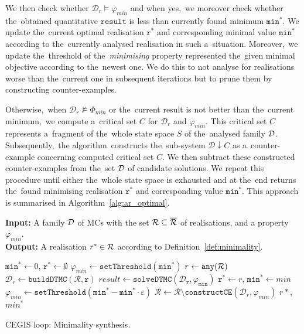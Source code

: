 We then check whether $\mathcal{D}_r \models \varphi_{min}$ and when yes,~we moreover check whether the~obtained quantitative $\mathtt{result}$ is less than currently found minimum $\mathtt{min^*}$.
We update the~current optimal realisation $\mathtt{r^*}$ and corresponding minimal value $\mathtt{min^*}$ according to the~currently analysed realisation in such a~situation.
Moreover,~we update the~threshold of the~\textit{minimising} property represented the~given minimal objective according to the~newest one.
We do this to not analyse for realisations worse than the~current one in subsequent iterations but to prune them by constructing counter-examples.

Otherwise,~when $\mathcal{D}_r \not\models \varPhi_{min}$ or the~current result is not better than the~current minimum,~we compute a~critical set $C$ for $\mathcal{D}_r$ and $\varphi_{min}$.
This critical set $C$ represents a~fragment of the~whole state space $S$ of the~analysed family $\mathcal{D}$.
Subsequently,~the algorithm~constructs the~sub-system $\mathcal{D}\!\downarrow\!C$ as a~counter-example concerning computed critical set $C$.
We then subtract these constructed counter-examples from the~set $\mathcal{D}$ of candidate solutions. 
We repeat this procedure until either the~whole state space is exhausted and at the~end returns the~found minimising realisation $\mathtt{r^*}$ and corresponding value $\mathtt{min^*}$.
This approach is summarised in Algorithm~\ref{alg:ar_optimal}.

\begin{algorithm}[h!]
\hspace*{\algorithmicindent} \textbf{Input:} A family $\mathcal{D}$ of MCs with the set $\mathcal{R} \subseteq \overline{\mathcal{R}}$ of realisations, and a property $\varphi_{min}$. \\
\hspace*{\algorithmicindent} \textbf{Output:}  A realisation $r^* \in \mathcal{R}$ according to Definition~\ref{def:minimality}. \\
\vspace*{-1.5em}
\begin{algorithmic}[1]
    \STATE $\mathtt{min^*} \leftarrow 0$, $\mathtt{r^*} \leftarrow \emptyset$
    \STATE $\varphi_{min} \leftarrow \mathtt{setThreshold(min^*)}$
    \WHILE{$\rlz \neq \emptyset$}
        \STATE $r \leftarrow \mathtt{any(\mathcal{R})}$
        \STATE $\mathcal{D}_r\leftarrow \mathtt{buildDTMC(\mathcal{R}, r)}$
        \STATE $result \leftarrow \mathtt{solveDTMC(\mathcal{D}_r, \varphi_{min})}$
            \STATE $\mathtt{r^*} \leftarrow r$, $\mathtt{min^*} \leftarrow min$
            \STATE $\varphi_{min} \leftarrow \mathtt{setThreshold(min^* - min^* \cdot \varepsilon)}$
        \ELSE
            \STATE $\mathcal{R} \leftarrow \mathcal{R} \setminus \mathtt{constructCE}(\mathcal{D}_r, \varphi_{min})$
        \ENDIF
    \ENDWHILE
    \RETURN $r*$, $min^*$
\end{algorithmic}
\caption{CEGIS loop: Minimality synthesis.}
\label{alg:ar_optimal}
\end{algorithm}

